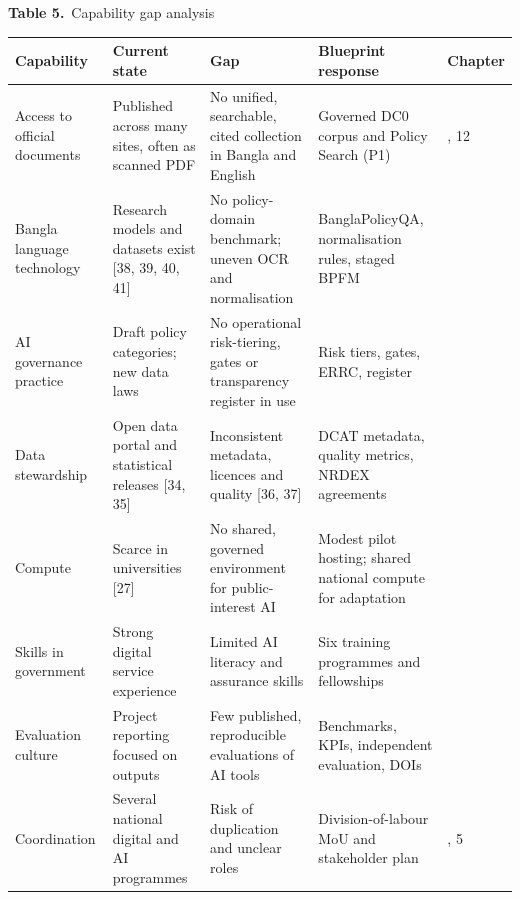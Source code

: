 \documentclass[border=10pt]{standalone}
\begin{document}
\begin{minipage}{17cm}
{\large\bfseries Table 5.}\ {\large Capability gap analysis}\par\vspace{7pt}
\small
{}
\begin{tabularx}{\linewidth}{@{}>{\hsize=0.876\hsize\raggedright\arraybackslash}X>{\hsize=1.237\hsize\raggedright\arraybackslash}X>{\hsize=1.237\hsize\raggedright\arraybackslash}X>{\hsize=1.237\hsize\raggedright\arraybackslash}X>{\hsize=0.412\hsize\raggedright\arraybackslash}X@{}}
\arrayrulecolor{bapilrule}\toprule
\rowcolor{white}\textbf{Capability} & \textbf{Current state} & \textbf{Gap} & \textbf{Blueprint response} & \textbf{Chapter} \\
\midrule
Access to official documents & Published across many sites, often as scanned PDF & No unified, searchable, cited collection in Bangla and English & Governed DC0 corpus and Policy Search (P1) & 8, 12 \\
Bangla language technology & Research models and datasets exist [38, 39, 40, 41] & No policy-domain benchmark; uneven OCR and normalisation & BanglaPolicyQA, normalisation rules, staged BPFM & 9 \\
AI governance practice & Draft policy categories; new data laws & No operational risk-tiering, gates or transparency register in use & Risk tiers, gates, ERRC, register & 13 \\
Data stewardship & Open data portal and statistical releases [34, 35] & Inconsistent metadata, licences and quality [36, 37] & DCAT metadata, quality metrics, NRDEX agreements & 8 \\
Compute & Scarce in universities [27] & No shared, governed environment for public-interest AI & Modest pilot hosting; shared national compute for adaptation & 10 \\
Skills in government & Strong digital service experience & Limited AI literacy and assurance skills & Six training programmes and fellowships & 6 \\
Evaluation culture & Project reporting focused on outputs & Few published, reproducible evaluations of AI tools & Benchmarks, KPIs, independent evaluation, DOIs & 18 \\
Coordination & Several national digital and AI programmes & Risk of duplication and unclear roles & Division-of-labour MoU and stakeholder plan & 3, 5 \\
\bottomrule
\end{tabularx}
\par{}
\end{minipage}
\end{document}
